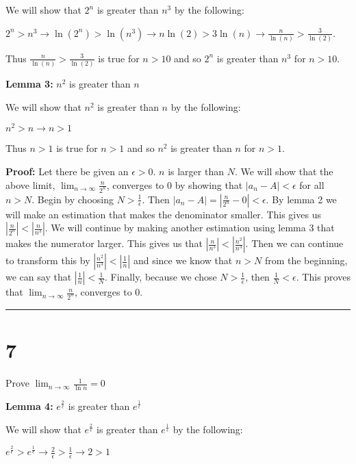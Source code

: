 \documentclass[12pt]{article}
\newcommand{\imp}{\rightarrow}
\newcommand\qedsym{\hfill \rule{2mm}{2mm}}
\begin{document}
We will show that $2^n$ is greater than $n^3$ by the following:

$2^n > n^3
  \imp \ln(2^n) > \ln(n^3)
  \imp n\ln(2) > 3\ln(n)
  \imp \frac{n}{\ln(n)} > \frac{3}{\ln(2)}$.

  Thus $\frac{n}{\ln(n)} > \frac{3}{\ln(2)}$ is true for $n>10$ and so $2^n$ is greater than $n^3$ for $n>10$.

\bigskip

\textbf{Lemma 3:} $n^2$ is greater than $n$

We will show that $n^2$ is greater than $n$ by the following:

$n^2 > n
  \imp n > 1$

  Thus $n>1$ is true for $n>1$ and so $n^2$ is greater than $n$ for $n>1$.

\bigskip

\textbf{Proof:} Let there be given an $\epsilon > 0$. $n$ is larger than $N$. We will show that the above limit, $\lim_{n\to \infty}\frac{n}{2^n}$, converges to $0$ by showing that $|a_n - A| < \epsilon$ for all $n > N$. Begin by choosing $N > \frac{1}{\epsilon}$. Then $|a_n - A| = |\frac{n}{2^n} - 0 | < \epsilon$. By lemma 2 we will make an estimation that makes the denominator smaller. This gives us $|\frac{n}{2^n}| < |\frac{n}{n^3}|$. We will continue by making another estimation using lemma 3 that makes the numerator larger. This gives us that $|\frac{n}{n^3}| < |\frac{n^2}{n^3}|$. Then we can continue to transform this by $|\frac{n^2}{n^3}| < |\frac{1}{n}|$ and since we know that $n > N$ from the beginning, we can say that $|\frac{1}{n}| < \frac{1}{N}$. Finally, because we chose $N > \frac{1}{\epsilon}$, then $\frac{1}{N} < \epsilon$. This proves that $\lim_{n\to \infty}\frac{n}{2^n}$, converges to $0$.

\qedsym{}

\section*{7}
Prove $\lim_{n\to \infty}\frac{1}{\ln n} = 0$

\bigskip

\textbf{Lemma 4:} $e^{\frac{2}{\epsilon}}$ is greater than $e^{\frac{1}{\epsilon}}$

We will show that $e^{\frac{2}{\epsilon}}$ is greater than $e^{\frac{1}{\epsilon}}$ by the following:

$e^{\frac{2}{\epsilon}} > e^{\frac{1}{\epsilon}}
  \imp \frac{2}{\epsilon} > \frac{1}{\epsilon}
  \imp 2 > 1$
\end{document}
